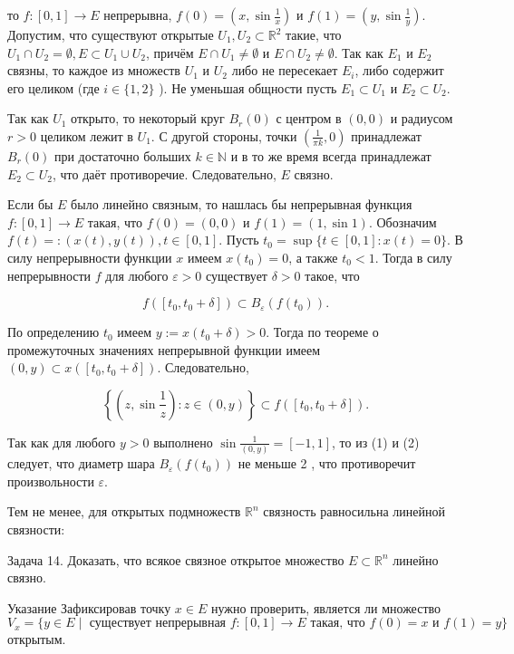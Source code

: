 \documentclass[a4paper,12pt]{article} %
\begin{document}
	то $f:[0,1] \rightarrow E$ непрерывна, $f(0)=\left(x, \sin \frac{1}{x}\right)$ и $f(1)=\left(y, \sin \frac{1}{y}\right)$. Допустим, что существуют открытые $U_{1}, U_{2} \subset \mathbb{R}^{2}$ такие, что $U_{1} \cap U_{2}=\emptyset, E \subset U_{1} \cup U_{2}$, причём $E \cap U_{1} \neq \emptyset$ и $E \cap U_{2} \neq \emptyset$. Так как $E_{1}$ и $E_{2}$ связны, то каждое из множеств $U_{1}$ и $U_{2}$ либо не пересекает $E_{i}$, либо содержит его целиком (где $i \in\{1,2\}$ ). Не уменьшая общности пусть $E_{1} \subset U_{1}$ и $E_{2} \subset U_{2}$.
	
	Так как $U_{1}$ открыто, то некоторый круг $B_{r}(0)$ с центром в $(0,0)$ и радиусом $r>0$ целиком лежит в $U_{1}$. С другой стороны, точки $\left(\frac{1}{\pi k}, 0\right)$ принадлежат $B_{r}(0)$ при достаточно больших $k \in \mathbb{N}$ и в то же время всегда принадлежат $E_{2} \subset U_{2}$, что даёт противоречие. Следовательно, $E$ связно.
	
	Если бы $E$ было линейно связным, то нашлась бы непрерывная функция $f:[0,1] \rightarrow E$ такая, что $f(0)=(0,0)$ и $f(1)=(1, \sin 1)$. Обозначим $f(t)=:(x(t), y(t)), t \in[0,1]$. Пусть $t_{0}=\sup \{t \in[0,1]: x(t)=0\}$. В силу непрерывности функции $x$ имеем $x\left(t_{0}\right)=0$, а также $t_{0}<1$. Тогда в силу непрерывности $f$ для любого $\varepsilon>0$ существует $\delta>0$ такое, что
	
	$$
	f\left(\left[t_{0}, t_{0}+\delta\right]\right) \subset B_{\varepsilon}\left(f\left(t_{0}\right)\right) .
	$$
	
	По определению $t_{0}$ имеем $y:=x\left(t_{0}+\delta\right)>0$. Тогда по теореме о промежуточных значениях непрерывной функции имеем $(0, y) \subset x\left(\left[t_{0}, t_{0}+\delta\right]\right)$. Следовательно,
	
	$$
	\left\{\left(z, \sin \frac{1}{z}\right): z \in(0, y)\right\} \subset f\left(\left[t_{0}, t_{0}+\delta\right]\right) .
	$$
	
	Так как для любого $y>0$ выполнено $\sin \frac{1}{(0, y)}=[-1,1]$, то из (1) и (2) следует, что диаметр шара $B_{\varepsilon}\left(f\left(t_{0}\right)\right)$ не меньше 2 , что противоречит произвольности $\varepsilon$.
	
	Тем не менее, для открытых подмножеств $\mathbb{R}^{n}$ связность равносильна линейной связности:
	
	Задача 14. Доказать, что всякое связное открытое множество $E \subset \mathbb{R}^{n}$ линейно связно.
	
  Указание
	Зафиксировав точку $x \in E$ нужно проверить, является ли множество
$$
V_x=\{y \in E \mid \text { существует непрерывная } f:[0,1] \rightarrow E \text { такая, что } f(0)=x \text { и } f(1)=y\}
$$
открытым.
\end{document}
